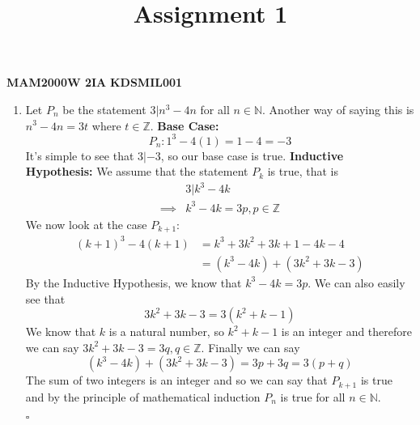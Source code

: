 \documentclass[12pt]{article}
\title{Assignment 1}
\numberwithin{equation}{section}
\begin{document}
    \maketitle
    \begin{center}
    \textbf{\large{MAM2000W 2IA}}\hspace{25pt}
    \textbf{\large{KDSMIL001}}
    \end{center}
    
    \begin{enumerate}
        \item Let $P_n$ be the statement $3|n^3-4n$ for all $n\in\mathbb{N}$. Another way of saying this is $n^3-4n=3t$ where $t\in\mathbb{Z}$.
        \newline 
        \newline
        \textbf{Base Case:} 
        \begin{equation*}
            P_n: 1^3-4(1)=1-4=-3
        \end{equation*}
        It's simple to see that $3|-3$, so our base case is true. 
        \newline
        \newline
        \textbf{Inductive Hypothesis:}\newline
        We assume that the statement $P_k$ is true, that is 
        \begin{align*}
            &3|k^3-4k \\
            \implies &k^3-4k = 3p, p\in\mathbb{Z}
        \end{align*}
        We now look at the case $P_{k+1}$:
        \begin{align*}
            (k+1)^3-4(k+1)&=k^3+3k^2+3k+1-4k-4 \\
            &=(k^3-4k)+(3k^2+3k-3)
        \end{align*}
        By the Inductive Hypothesis, we know that $k^3-4k=3p$. We can also easily see that 
        \begin{equation*}
            3k^2+3k-3=3(k^2+k-1)
        \end{equation*}
        We know that $k$ is a natural number, so $k^2+k-1$ is an integer and therefore we can say $3k^2+3k-3=3q, q\in\mathbb{Z}$. Finally we can say
        \begin{equation*}
            (k^3-4k)+(3k^2+3k-3)=3p+3q=3(p+q)
        \end{equation*}
        The sum of two integers is an integer and so we can say that $P_{k+1}$ is true and by the principle of mathematical induction $P_n$ is true for all $n\in\mathbb{N}$.
        \newline 
        \begin{flushright}$\square$\end{flushright}

    \end{enumerate}
\end{document}

